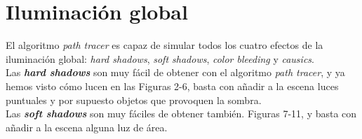 \documentclass{article}
\begin{document}
\newpage

\section{Iluminación global}

El algoritmo \textit{path tracer} es capaz de simular todos los cuatro efectos
de la iluminación global: \textit{hard shadows}, \textit{soft shadows},
\textit{color bleeding} y \textit{causics}. \\

Las \textbf{\textit{hard shadows}} son muy fácil de obtener con el algoritmo
\textit{path tracer}, y ya hemos visto cómo lucen en las Figuras 2-6, basta con
añadir a la escena luces puntuales y por supuesto objetos que provoquen la sombra. \\

Las \textbf{\textit{soft shadows}} son muy fáciles de obtener también. Figuras
7-11, y basta con añadir a la escena alguna luz de área. \\
\end{document}
